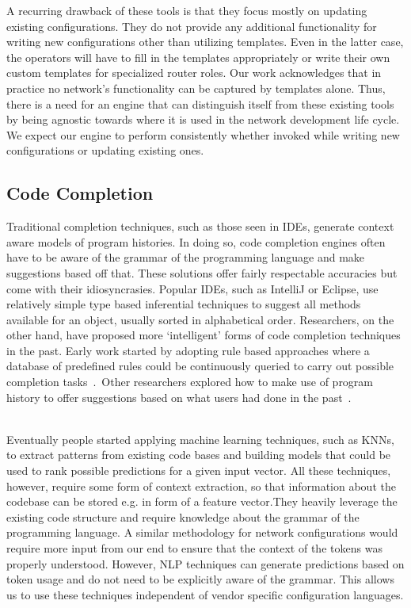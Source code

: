 A recurring drawback of these tools is that they focus mostly on updating existing configurations. They do not provide any additional functionality for writing new configurations other than utilizing templates. Even in the latter case, the operators will have to fill in the templates appropriately or write their own custom templates for specialized router roles. Our work acknowledges that in practice no network’s functionality can be captured by templates alone. Thus, there is a need for an engine that can distinguish itself from these existing tools by being agnostic towards where it is used in the network development life cycle. We expect our engine to perform consistently whether invoked while writing new configurations or updating existing ones.

\subsection{Code Completion}

Traditional completion techniques, such as those seen in IDEs, generate context aware models of program histories. In doing so, code completion engines often have to be aware of the grammar of the programming language and make suggestions based off that. These solutions offer fairly respectable accuracies but come with their idiosyncrasies. Popular IDEs, such as IntelliJ or Eclipse, use relatively simple type based inferential techniques to suggest all methods available for an object, usually sorted in alphabetical order. Researchers, on the other hand, have proposed more ‘intelligent’ forms of code completion techniques in the past. Early work started by adopting rule based approaches where a database of predefined rules could be continuously queried to carry out possible completion tasks~\cite{kaiser}.  Other researchers explored how to make use of program history to offer suggestions based on what users had done in the past~\cite{robbes}.\\  

Eventually people started applying machine learning techniques, such as KNNs, to extract patterns from existing code bases and building models that could be used to rank possible predictions for a given input vector. All these techniques, however, require some form of context extraction, so that information about the codebase can be stored e.g. in form of a feature vector.They heavily leverage the existing code structure and require knowledge about the grammar of the programming language. A similar methodology for network configurations would require more input from our end to ensure that the context of the tokens was properly understood. However, NLP techniques can generate predictions based on token usage and do not need to be explicitly aware of the grammar. This allows us to use these techniques independent of vendor specific configuration languages. 

